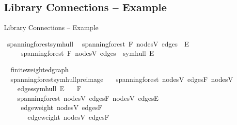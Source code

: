 \documentclass[%
	sans,
	12pt,
]{beamer}
\def\isacartoucheopen{}%
\def\isacartoucheclose{}%
\begin{document}
\subsection{Library Connections -- Example}
\begin{frame}{Library Connections -- Example}\pause
\begin{isabelle}
	\isamarkupfalse%
	\ spanning{\isacharunderscore}forest{\isacharunderscore}symhull{\isacharcolon}\isanewline
	\ \ {\isacartoucheopen}spanning{\isacharunderscore}forest\ F\ {\isasymlparr}nodes{\isacharequal}V{\isacharcomma}\ edges\ {\isacharequal}\ E{\isasymrparr}\ \\\ \ \ \ {\isasymLongrightarrow}\ spanning{\isacharunderscore}forest\ F\ {\isasymlparr}nodes{\isacharequal}V{\isacharcomma}\ edges\ {\isacharequal}\ symhull\ E{\isasymrparr}{\isacartoucheclose}
\end{isabelle}\pause
\begin{isabelle}
	\isamarkupfalse%
	\ {\isacharparenleft}\ finite{\isacharunderscore}weighted{\isacharunderscore}graph{\isacharparenright}\\\ \ spanning{\isacharunderscore}forest{\isacharunderscore}symhull{\isacharunderscore}preimage{\isacharcolon}\isanewline
	\ \ \ {\isacartoucheopen}spanning{\isacharunderscore}forest\ {\isasymlparr}nodes{\isacharequal}V{\isacharcomma}\ edges{\isacharequal}F{\isasymrparr}\ {\isasymlparr}nodes{\isacharequal}V{\isacharcomma}\\\ \ \ \  edges{\isacharequal}symhull\ E{\isasymrparr}{\isacartoucheclose}\isanewline
	\ \ \ {\isacartoucheopen}{\isasymexists}F{\isacharprime}{\isachardot}\\\ \ \ \ spanning{\isacharunderscore}forest\ {\isasymlparr}nodes{\isacharequal}V{\isacharcomma}\ edges{\isacharequal}F{\isacharprime}{\isasymrparr}\ {\isasymlparr}nodes{\isacharequal}V{\isacharcomma}\ edges{\isacharequal}E{\isasymrparr}\isanewline
	\ \ \ \ {\isasymand}\ edge{\isacharunderscore}weight\ {\isasymlparr}nodes{\isacharequal}V{\isacharcomma}\ edges{\isacharequal}F{\isacharprime}{\isasymrparr}\ \\\ \ \ \ \ \  {\isacharequal}\ edge{\isacharunderscore}weight\ {\isasymlparr}nodes{\isacharequal}V{\isacharcomma}\ edges{\isacharequal}F{\isasymrparr}{\isacartoucheclose}
\end{isabelle}
\end{frame}
\end{document}
